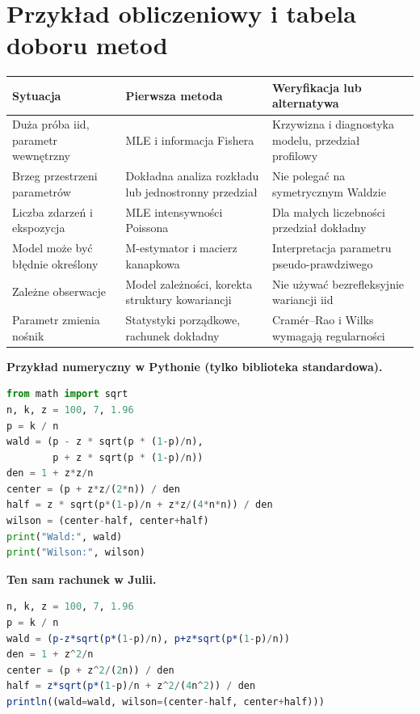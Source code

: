 \documentclass[11pt,a4paper,oneside]{report}
\numberwithin{equation}{chapter}
\theoremstyle{plain}
\theoremstyle{definition}
\theoremstyle{remark}
\begin{document}
\section{Przykład obliczeniowy i tabela doboru metod}
\begin{center}\small
\begin{tabular}{>{\raggedright\arraybackslash}p{}>{\raggedright\arraybackslash}p{}>{\raggedright\arraybackslash}p{}}
\toprule
\textbf{Sytuacja} & \textbf{Pierwsza metoda} & \textbf{Weryfikacja lub alternatywa}\\
\midrule
Duża próba iid, parametr wewnętrzny & MLE i informacja Fishera & Krzywizna i diagnostyka modelu, przedział profilowy\\
Brzeg przestrzeni parametrów & Dokładna analiza rozkładu lub jednostronny przedział & Nie polegać na symetrycznym Waldzie\\
Liczba zdarzeń i ekspozycja & MLE intensywności Poissona & Dla małych liczebności przedział dokładny\\
Model może być błędnie określony & M-estymator i macierz kanapkowa & Interpretacja parametru pseudo-prawdziwego\\
Zależne obserwacje & Model zależności, korekta struktury kowariancji & Nie używać bezrefleksyjnie wariancji iid\\
Parametr zmienia nośnik & Statystyki porządkowe, rachunek dokładny & Cramér--Rao i Wilks wymagają regularności\\
\bottomrule
\end{tabular}
\end{center}

\noindent\textbf{Przykład numeryczny w Pythonie (tylko biblioteka standardowa).}\par
\par
{}
\smallskip
\begin{lstlisting}[language=Python,caption={Porównanie przedziałów Walda i Wilsona dla odsetka wad.}]
from math import sqrt
n, k, z = 100, 7, 1.96
p = k / n
wald = (p - z * sqrt(p * (1-p)/n),
        p + z * sqrt(p * (1-p)/n))
den = 1 + z*z/n
center = (p + z*z/(2*n)) / den
half = z * sqrt(p*(1-p)/n + z*z/(4*n*n)) / den
wilson = (center-half, center+half)
print("Wald:", wald)
print("Wilson:", wilson)
\end{lstlisting}

\noindent\textbf{Ten sam rachunek w Julii.}\par
\par
{}
\smallskip
\begin{lstlisting}[language=Julia,caption={Obliczanie przedziałów Walda i Wilsona w Julii.}]
n, k, z = 100, 7, 1.96
p = k / n
wald = (p-z*sqrt(p*(1-p)/n), p+z*sqrt(p*(1-p)/n))
den = 1 + z^2/n
center = (p + z^2/(2n)) / den
half = z*sqrt(p*(1-p)/n + z^2/(4n^2)) / den
println((wald=wald, wilson=(center-half, center+half)))
\end{lstlisting}
\end{document}
